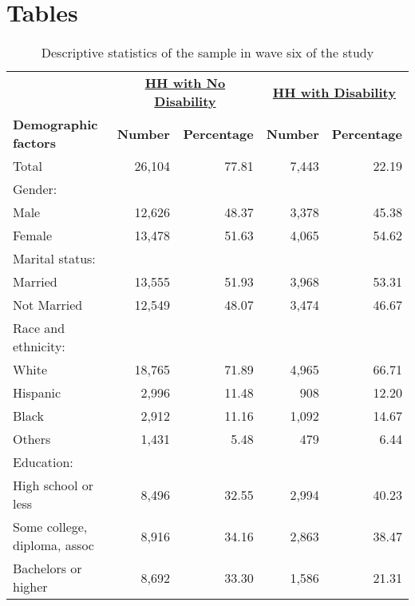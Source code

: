 
\section{Tables}

\noindent
\begin{table}[H] 
\centering 
\caption{Descriptive statistics of the sample in wave six of the study} 
\begin{tabular}{lrrrr}
\hline 
\hline 
& \multicolumn{2}{c}{\underline{\bf{HH with No Disability}}} & \multicolumn{2}{c}{\underline{\bf{HH with Disability}}} \\
{\bf{Demographic factors}} & {\bf{Number}} & {\bf{Percentage}} & {\bf{Number}} & {\bf{Percentage}} \\
\hline 
Total					& 26,104	& 77.81		& 7,443		& 22.19		\\
Gender:					&		&		&		& 		\\
\hspace{5pt} Male			& 12,626	& 48.37		& 3,378		& 45.38		\\
\hspace{5pt} Female			& 13,478	& 51.63		& 4,065		& 54.62		\\
Marital status:				&		&		&		& 		\\
\hspace{5pt} Married			& 13,555	& 51.93		& 3,968		& 53.31		\\
\hspace{5pt} Not Married		& 12,549	& 48.07		& 3,474		& 46.67		\\
Race and ethnicity:			&		&		&		& 		\\
\hspace{5pt} White			& 18,765 	& 71.89		& 4,965		& 66.71		\\
\hspace{5pt} Hispanic			&  2,996	& 11.48		&   908		& 12.20		\\
\hspace{5pt} Black			&  2,912	& 11.16		& 1,092		& 14.67		\\
\hspace{5pt} Others			&  1,431	&  5.48		&   479		&  6.44		\\
Education:				&		&		&		& 		\\
\hspace{5pt} High school or less	&  8,496 	& 32.55		& 2,994		& 40.23		\\
\hspace{5pt} Some college, diploma, assoc& 8,916 	& 34.16		& 2,863		& 38.47		\\
\hspace{5pt} Bachelors or higher	&  8,692 	& 33.30		& 1,586		& 21.31		\\
\hline 
\hline 
\end{tabular}
\label{tab:DescStats}
\end{table}


